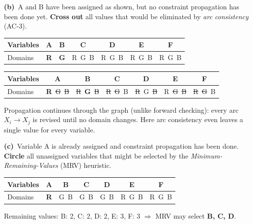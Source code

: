 \documentclass[11pt,a4paper]{article}
\newcommand{\subq}[1]{\par\smallskip\noindent\textbf{#1}\ }
\begin{document}
\subq{(b)}A and B have been assigned as shown, but no constraint propagation has been done yet. \textbf{Cross out} all values that would be eliminated by \emph{arc consistency} (AC-3).\begin{center}\small\begin{tabular}{|l|c|c|c|c|c|c|}\hline Variables & \textbf{A} & \textbf{B} & \textbf{C} & \textbf{D} & \textbf{E} & \textbf{F}\\ \hline Domains & \textbf{R} & \textbf{G} & R\ G\ B & R\ G\ B & R\ G\ B & R\ G\ B\\ \hline\end{tabular}\end{center}
\begin{solbox}
\begin{center}\small\begin{tabular}{|l|c|c|c|c|c|c|}\hline Variables & \textbf{A} & \textbf{B} & \textbf{C} & \textbf{D} & \textbf{E} & \textbf{F}\\ \hline Domains & \textbf{R}\ \textcolor{red!70!black}{\sout{G}}\ \textcolor{red!70!black}{\sout{B}} & \textcolor{red!70!black}{\sout{R}}\ \textbf{G}\ \textcolor{red!70!black}{\sout{B}} & \textcolor{red!70!black}{\sout{R}}\ \textcolor{red!70!black}{\sout{G}}\ B & \textcolor{red!70!black}{\sout{R}}\ G\ \textcolor{red!70!black}{\sout{B}} & R\ \textcolor{red!70!black}{\sout{G}}\ \textcolor{red!70!black}{\sout{B}} & \textcolor{red!70!black}{\sout{R}}\ \textcolor{red!70!black}{\sout{G}}\ B\\ \hline\end{tabular}\end{center}Propagation continues through the graph (unlike forward checking): every arc $X_i\to X_j$ is revised until no domain changes. Here arc consistency even leaves a single value for every variable.
\end{solbox}
\subq{(c)}Variable A is already assigned and constraint propagation has been done. \textbf{Circle} all unassigned variables that might be selected by the \emph{Minimum-Remaining-Values} (MRV) heuristic.\begin{center}\small\begin{tabular}{|l|c|c|c|c|c|c|}\hline Variables & \textbf{A} & \textbf{B} & \textbf{C} & \textbf{D} & \textbf{E} & \textbf{F}\\ \hline Domains & \textbf{R} & G\ B & G\ B & G\ B & R\ G\ B & R\ G\ B\\ \hline\end{tabular}\end{center}
\begin{solbox}
Remaining values: B: 2, C: 2, D: 2, E: 3, F: 3 $\Rightarrow$ MRV may select \textbf{B, C, D}.
\end{solbox}
\end{document}
